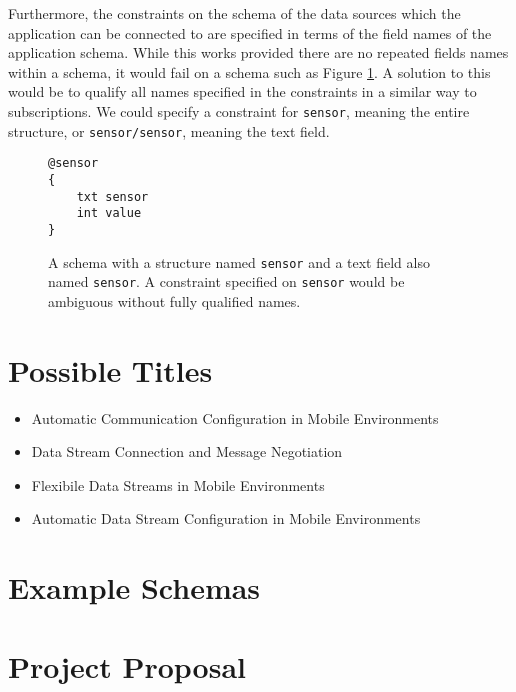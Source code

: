 \documentclass[12pt,twoside,notitlepage]{report}
\begin{document}
Furthermore, the constraints on the schema of the data sources which the application can be connected to are specified in terms of the field names of the application schema. 
While this works provided there are no repeated fields names within a schema, it would fail on a schema such as Figure \ref{fig:repeatednameschema}. 
A solution to this would be to qualify all names specified in the constraints in a similar way to subscriptions. 
We could specify a constraint for {\tt sensor}, meaning the entire structure, or {\tt sensor/sensor}, meaning the text field.

\begin{figure}[h]
\begin{lstlisting}
@sensor
{
	txt sensor
	int value
}
\end{lstlisting}
\caption[Schema with repeated name]{A schema with a structure named {\tt sensor} and a text field also named {\tt sensor}. A constraint specified on {\tt sensor} would be ambiguous without fully qualified names.}
\label{fig:repeatednameschema}
\end{figure}

\cleardoublepage


\nocite{*}

\cleardoublepage

\appendix

\chapter{Possible Titles}

\begin{itemize}
\item Automatic Communication Configuration in Mobile Environments
\item Data Stream Connection and Message Negotiation
\item Flexibile Data Streams in Mobile Environments
\item Automatic Data Stream Configuration in Mobile Environments
\end{itemize}

\cleardoublepage

\chapter{Example Schemas}



\cleardoublepage

\chapter{Project Proposal}


\end{document}
